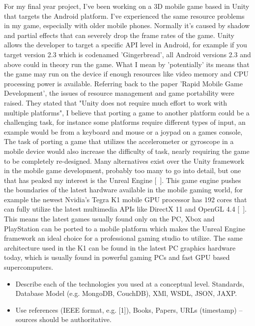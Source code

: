 For my final year project, I've been working on a 3D mobile game based in Unity that targets the Android platform. I've experienced the same resource problems in my game, especially with older mobile phones. Normally it’s caused by shadow and partial effects that can severely drop the frame rates of the game. Unity allows the developer to target a specific API level in Android, for example if you target version 2.3 which is codenamed 'Gingerbread', all Android versions 2.3 and above could in theory run the game. What I mean by 'potentially' its means that the game may run on the device if enough resources like video memory and CPU processing power is available. Referring back to the paper 'Rapid Mobile Game Development', the issues of resource management and game portability were raised. They stated that "Unity does not require much effort to work with multiple platforms", I believe that porting a game to another platform could be a challenging task, for instance some platforms require different types of input, an example would be from a keyboard and mouse or a joypad on a games console, The task of porting a game that utilizes the accelerometer or gyroscope in a mobile device would also increase the difficulty of task, nearly requiring the game to be completely re-designed. Many alternatives exist over the Unity framework in the mobile game development, probably too many to go into detail, but one that has peaked my interest is the Unreal Engine [~\cite{Unreal-Engine}]. This game engine pushes the boundaries of the latest hardware available in the mobile gaming world, for example the newest Nvidia’s Tegra K1 mobile GPU processor has 192 cores that can fully utilize the latest multimedia APIs like DirectX 11 and OpenGL 4.4 [~\cite{Nvidia-K1}]. This means the latest games usually found only on the PC, Xbox and PlayStation can be ported to a mobile platform which makes the Unreal Engine framework an ideal choice for a professional gaming studio to utilize. The same architecture used in the K1 can be found in the latest PC graphics hardware today, which is usually found in powerful gaming PCs and fast GPU based supercomputers. 

\begin{itemize}
\item Describe each of the technologies you used at a conceptual level. Standards, Database Model (e.g. MongoDB, CouchDB), XMl, WSDL, JSON, JAXP.
\item Use references (IEEE format, e.g. [1]), Books, Papers, URLs (timestamp) – sources should be authoritative. 
\end{itemize}

